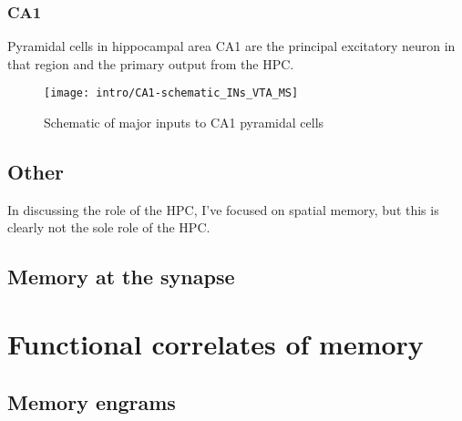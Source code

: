 \subsubsection{CA1}
Pyramidal cells in hippocampal area CA1 are the principal excitatory neuron in that region and the primary output from the \ac{HPC}.
\begin{figure}
	\centering
	\texttt{[image: intro/CA1-schematic\_INs\_VTA\_MS]}
	\caption{Schematic of major inputs to CA1 pyramidal cells}
	\label{fig:intro:memory:CA1_schematic}
\end{figure}


\subsection{Other}
In discussing the role of the \ac{HPC}, I've focused on spatial memory, but this is clearly not the sole role of the \ac{HPC}.

\subsection{Memory at the synapse}

\section{Functional correlates of memory}\label{sec:intro:memory:physiology}

\subsection{}

\subsection{Memory engrams}

